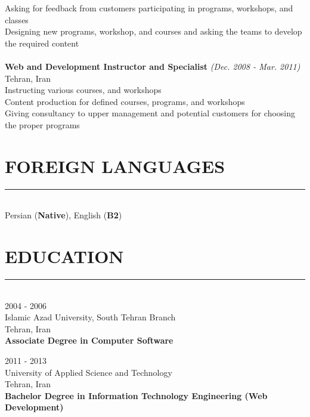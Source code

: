 \documentclass[10pt,a4paper]{article}
\begin{document}
\indent \textbullet \hspace{0.05cm} Asking for feedback from customers participating in programs, workshops, and classes \\
\indent \textbullet \hspace{0.05cm} Designing new programs, workshop, and courses and asking the teams to develop the required content  \\
\\
\indent \small \textbf{Web and Development Instructor and Specialist} \textsl{(Dec. 2008 - Mar. 2011)} \\
\indent \textnormal{Tehran, Iran} \\
\indent \textbullet \hspace{0.05cm} Instructing various courses, and workshops \\
\indent \textbullet \hspace{0.05cm} Content production for defined courses, programs, and workshops \\
\indent \textbullet \hspace{0.05cm} Giving consultancy to upper management and potential customers for choosing the proper programs \\
    
\section{FOREIGN LANGUAGES}
\noindent \rule {18.0cm}{0.2pt} \\
    Persian (\textbf{Native}), English (\textbf{B2}) \\

\section{EDUCATION}
\noindent \rule {18.0cm}{0.2pt} \\
\textbullet \hspace{0.1cm} 2004 - 2006 \\
Islamic Azad University, South Tehran Branch \\
Tehran, Iran \\
\textbf{Associate Degree in Computer Software}
\vspace{0.3cm}

\noindent \textbullet \hspace{0.1cm}  2011 - 2013 \\
University of Applied Science and Technology \\
Tehran, Iran \\
\textbf{Bachelor Degree in Information Technology Engineering (Web Development)}
\end{document}
